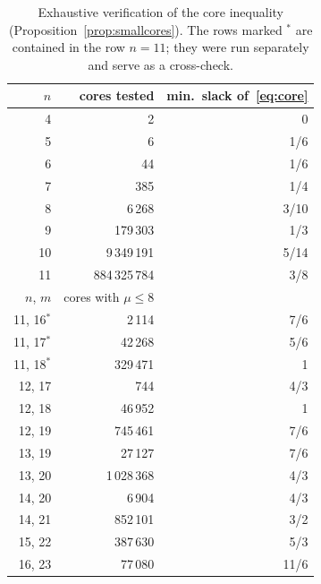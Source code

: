 \documentclass[11pt]{amsart}
\theoremstyle{definition}
\begin{document}
\begin{table}[ht]
\centering
\begin{tabular}{rrr}
\toprule
$n$ & cores tested & min.\ slack of~\eqref{eq:core}\\
\midrule
4 & 2 & 0 \\ 5 & 6 & 1/6 \\ 6 & 44 & 1/6 \\ 7 & 385 & 1/4 \\ 8 & 6\,268 & 3/10 \\ 9 & 179\,303 & 1/3 \\
10 & 9\,349\,191 & 5/14 \\ 11 & 884\,325\,784 & 3/8 \\
\midrule
$n$, $m$ & cores with $\mu\le8$ & \\
\midrule
11, 16$^*$ & 2\,114 & 7/6\\ 11, 17$^*$ & 42\,268 & 5/6 \\ 11, 18$^*$ & 329\,471 & 1\\
12, 17 & 744 & 4/3\\ 12, 18 & 46\,952 & 1\\ 12, 19 & 745\,461 & 7/6\\
13, 19 & 27\,127 & 7/6\\ 13, 20 & 1\,028\,368 & 4/3\\
14, 20 & 6\,904 & 4/3\\ 14, 21 & 852\,101 & 3/2\\
15, 22 & 387\,630 & 5/3\\ 16, 23 & 77\,080 & 11/6\\
\bottomrule
\end{tabular}
\caption{Exhaustive verification of the core inequality (Proposition~\ref{prop:smallcores}). The rows marked $^*$
are contained in the row $n=11$; they were run separately and serve as a cross-check.}\label{tab:core}
\end{table}
\end{document}
